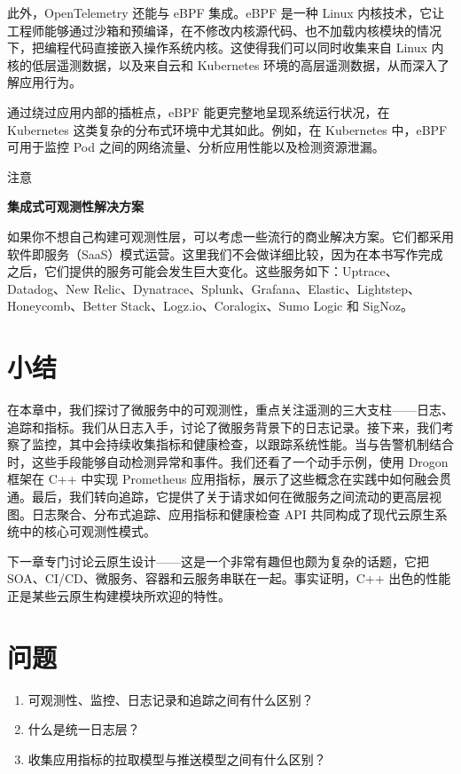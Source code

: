 此外，OpenTelemetry 还能与 eBPF 集成。eBPF 是一种 Linux 内核技术，它让工程师能够通过沙箱和预编译，在不修改内核源代码、也不加载内核模块的情况下，把编程代码直接嵌入操作系统内核。这使得我们可以同时收集来自 Linux 内核的低层遥测数据，以及来自云和 Kubernetes 环境的高层遥测数据，从而深入了解应用行为。

\label{idx:1920}
通过绕过应用内部的插桩点，eBPF 能更完整地呈现系统运行状况，在 Kubernetes 这类复杂的分布式环境中尤其如此。例如，在 Kubernetes 中，eBPF 可用于监控 Pod 之间的网络流量、分析应用性能以及检测资源泄漏。

\begin{myNotic}{注意}

\textbf{集成式可观测性解决方案}

\label{idx:1921}
如果你不想自己构建可观测性层，可以考虑一些流行的商业解决方案。它们都采用软件即服务（SaaS）模式运营。这里我们不会做详细比较，因为在本书写作完成之后，它们提供的服务可能会发生巨大变化。这些服务如下：Uptrace、Datadog、New Relic、Dynatrace、Splunk、Grafana、Elastic、Lightstep、Honeycomb、Better Stack、Logz.io、Coralogix、Sumo Logic 和 SigNoz。
\end{myNotic}

\section{小结}

在本章中，我们探讨了微服务中的可观测性，重点关注遥测的三大支柱——日志、追踪和指标。我们从日志入手，讨论了微服务背景下的日志记录。接下来，我们考察了监控，其中会持续收集指标和健康检查，以跟踪系统性能。当与告警机制结合时，这些手段能够自动检测异常和事件。我们还看了一个动手示例，使用 Drogon 框架在 C++ 中实现 Prometheus 应用指标，展示了这些概念在实践中如何融会贯通。最后，我们转向追踪，它提供了关于请求如何在微服务之间流动的更高层视图。日志聚合、分布式追踪、应用指标和健康检查 API 共同构成了现代云原生系统中的核心可观测性模式。

下一章专门讨论云原生设计——这是一个非常有趣但也颇为复杂的话题，它把 SOA、CI/CD、微服务、容器和云服务串联在一起。事实证明，C++ 出色的性能正是某些云原生构建模块所欢迎的特性。

\section{问题}

\begin{enumerate}
\item 可观测性、监控、日志记录和追踪之间有什么区别？
\item 什么是统一日志层？
\item 收集应用指标的拉取模型与推送模型之间有什么区别？
\end{enumerate}

